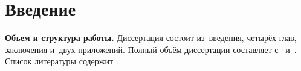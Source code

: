 \chapter*{Введение}							%

\newcommand{\actuality}{}
\newcommand{\aim}{\textbf{Целью}}
\newcommand{\tasks}{\textbf{задачи}}
\newcommand{\defpositions}{\textbf{Основные положения, выносимые на~защиту:}}
\newcommand{\novelty}{\textbf{Научная новизна:}}
\newcommand{\influence}{\textbf{Научная и практическая значимость}}
\newcommand{\reliability}{\textbf{Степень достоверности}}
\newcommand{\probation}{\textbf{Апробация работы.}}
\newcommand{\contribution}{\textbf{Личный вклад.}}
\newcommand{\publications}{\textbf{Публикации.}}



\textbf{Объем и структура работы.} Диссертация состоит из~введения, четырёх глав, заключения и~двух приложений.
%
Полный объём диссертации составляет  
с~
и~. Список литературы содержит  
.
